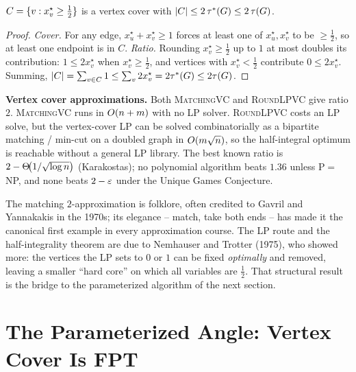 \begin{lemma}
\label{ch29:lem-lpvc}
$C=\{v:x^\star_v\ge\tfrac12\}$ is a vertex cover with
$\lvert C\rvert\le 2\,\tau^*(G)\le 2\,\tau(G)$.
\end{lemma}

\begin{proof}
\emph{Cover.} For any edge, $x^\star_u+x^\star_v\ge1$ forces at least one of
$x^\star_u,x^\star_v$ to be $\ge\tfrac12$, so at least one endpoint is in $C$.
\emph{Ratio.} Rounding $x^\star_v\ge\tfrac12$ up to $1$ at most doubles its
contribution: $1\le 2x^\star_v$ when $x^\star_v\ge\tfrac12$, and vertices with
$x^\star_v<\tfrac12$ contribute $0\le 2x^\star_v$. Summing,
$\lvert C\rvert=\sum_{v\in C}1\le\sum_v 2x^\star_v=2\tau^*(G)\le2\tau(G)$.
\end{proof}

\begin{complexitybox}
\textbf{Vertex cover approximations.} Both \textsc{MatchingVC} and
\textsc{RoundLPVC} give ratio $2$. \textsc{MatchingVC} runs in $O(n+m)$ with no
LP solver. \textsc{RoundLPVC} costs an LP solve, but the vertex-cover LP can be
solved combinatorially as a bipartite matching / min-cut on a doubled graph in
$O(m\sqrt n)$, so the half-integral optimum is reachable without a general LP
library. The best known ratio is $2-\Theta\!\big(1/\sqrt{\log n}\big)$ (Karakostas);
no polynomial algorithm beats $1.36$ unless P${}={}$NP, and none beats $2-\varepsilon$
under the Unique Games Conjecture.
\end{complexitybox}

\begin{historybox}
The matching $2$-approximation is folklore, often credited to Gavril and
Yannakakis in the 1970s; its elegance -- match, take both ends -- has made it the
canonical first example in every approximation course. The LP route and the
half-integrality theorem are due to Nemhauser and Trotter (1975), who showed
more: the vertices the LP sets to $0$ or $1$ can be fixed \emph{optimally} and
removed, leaving a smaller ``hard core'' on which all variables are $\tfrac12$.
That structural result is the bridge to the parameterized algorithm of the next
section.
\end{historybox}

\section{The Parameterized Angle: Vertex Cover Is FPT}
\label{ch29:fpt}

